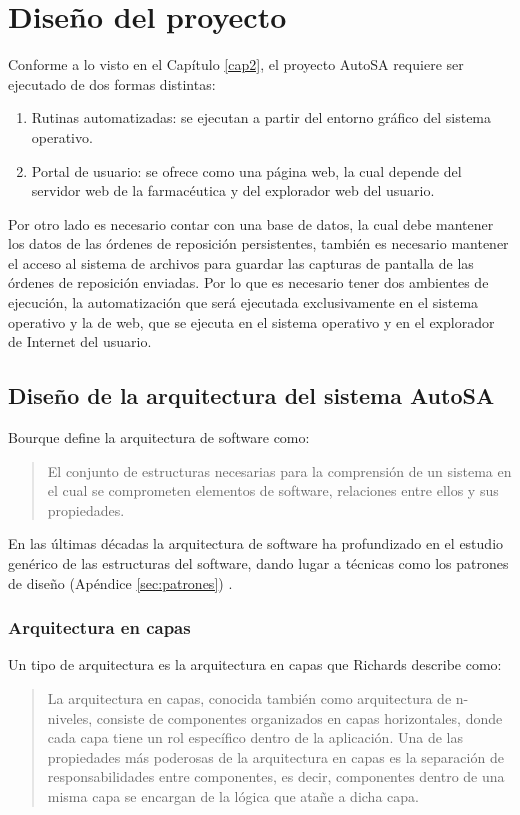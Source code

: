 \chapter{Diseño del proyecto}\label{cap3}
Conforme a lo visto en el Capítulo \ref{cap2}, el proyecto AutoSA requiere ser ejecutado de dos formas distintas:
\begin{enumerate}
 	\item Rutinas automatizadas: se ejecutan a partir del entorno gráfico del sistema operativo.
 	\item Portal de usuario: se ofrece como una página web, la cual depende del servidor web de la farmacéutica y del explorador web del usuario.
\end{enumerate}
Por otro lado es necesario contar con una base de datos, la cual debe mantener los datos de las órdenes de reposición persistentes, también es necesario mantener el acceso al sistema de archivos para guardar las capturas de pantalla de las órdenes de reposición enviadas. Por lo que es necesario tener dos ambientes de ejecución, la automatización que será ejecutada exclusivamente en el sistema operativo y la de web, que se ejecuta en el sistema operativo y en el explorador de Internet del usuario.




\section{Diseño de la arquitectura del sistema AutoSA}
Bourque\cite{SWEBOOK} define la arquitectura de software como:
\begin{quote}
	El conjunto de estructuras necesarias para la comprensión de un sistema en el cual se comprometen elementos de software, relaciones entre ellos y sus propiedades.
\end{quote}
En las últimas décadas la arquitectura de software ha profundizado en el estudio genérico de las estructuras del software, dando lugar a técnicas como los patrones de diseño (Apéndice \ref{sec:patrones}) \cite{SWEBOOK, SoftwareArchitectureInAction}.

\subsection{Arquitectura en capas}
Un tipo de arquitectura es la arquitectura en capas que Richards\cite{SoftwareArchitecturePatterns} describe como:
\begin{quote}
La arquitectura en capas, conocida también como arquitectura de n-niveles, consiste de componentes organizados en capas horizontales, donde cada capa tiene un rol específico dentro de la aplicación. Una de las propiedades más poderosas de la arquitectura en capas es la separación de responsabilidades entre componentes, es decir, componentes dentro de una misma capa se encargan de la lógica que atañe a dicha capa.
\end{quote}

